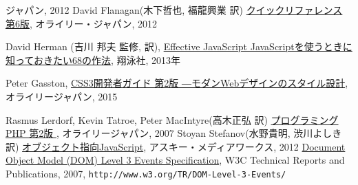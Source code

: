 \begin{thebibliography}{99}
	 ジャパン, 2012
 David Flanagan(木下哲也, 福龍興業 訳) 
            \href{http://www.amazon.co.jp/JavaScriptリファレンス-第6版-David-Flanagan/dp/4873115531/ref=sr_1_11?ie=UTF8&qid=1353802698&sr=8-11}
{\JS{} クイックリファレンス 第6版}, オライリー・ジャパン, 2012
\iffalse
 \bibitem{geroimenko}
Vladimir Geroimenko, Chaomei Chen(Ed.),\\
\href{http://www.amazon.co.jp/exec/obidos/ASIN/1852337907/qid=1146667282/sr=1-1/ref=sr_1_10_1/249-3353534-4529100}
   {\it Visualizing
	Information Using SVG and X3D: XML-based Technologies For The
	XML-based Web}, Springer Verlag 2005
\fi
{}David Herman (吉川 邦夫 監修, 訳),
\href{http://www.amazon.co.jp/Effective-JavaScript-JavaScript%E3%82%92%E4%BD%BF%E3%81%86%E3%81%A8%E3%81%8D%E3%81%AB%E7%9F%A5%E3%81%A3%E3%81%A6%E3%81%8A%E3%81%8D%E3%81%9F%E3%81%8468%E3%81%AE%E5%86%B4%E3%81%88%E3%81%9F%E3%82%84%E3%82%8A%E6%96%B9-David-Herman/dp/4798131113/ref=sr_1_1?ie=UTF8&qid=1365329955&sr=8-1&keywords=JavaScript%E3%82%92%E4%BD%BF%E3%81%86%E3%81%A8%E3%81%8D%E3%81%AB%E7%9F%A5%E3%81%A3%E3%81%A6%E3%81%8A%E3%81%8D%E3%81%9F%E3%81%84%EF%BC%96%EF%BC%98}
{Effective JavaScript JavaScriptを使うときに知っておきたい68の作法}, 
翔泳社, 2013年

 Peter Gasston,
				 \href{https://www.amazon.co.jp/s/ref=nb_sb_ss_i_5_4/351-1343008-2819052?__mk_ja_JP=%E3%82%AB%E3%82%BF%E3%82%AB%E3%83%8A&url=search-alias%3Daps&field-keywords=css3%E9%96%8B%E7%99%BA%E8%80%85%E3%82%AC%E3%82%A4%E3%83%89&sprefix=css3%2Caps%2C226&crid=2KO0TT8P0FOGT}{CSS3開発者ガイド 第2版 ―モダンWebデザインのスタイル設計},
				 オライリージャパン, 2015

\ifSeminor
\else
{}
Rasmus Lerdorf, Kevin Tatroe, Peter MacIntyre(高木正弘 訳)
\href{http://www.amazon.co.jp/プログラミングPHP-第2版-Rasmus-Lerdorf/dp/4873113423/ref=sr_1_6?ie=UTF8&s=gateway&qid=1202533375&sr=8-6}
        {プログラミングPHP 第2版 },  オライリージャパン, 2007
\fi
 Stoyan Stefanov(水野貴明, 渋川よしき 訳)
\href{http://www.amazon.co.jp/オブジェクト指向
	JavaScript-Stoyan-Stefanov/dp/4048706705/ref=sr_1_1?ie=UTF8&qid=1353803180&sr=8-1}
{オブジェクト指向JavaScript}, アスキー・メディアワークス, 2012
\href{http://www.w3.org/TR/2007/DOM-Level-3-Events-20071221/}
{Document Object Model (DOM) Level 3 Events Specification},
    W3C Technical Reports and Publications, 2007,
\texttt{http://www.w3.org/TR/DOM-Level-3-Events/}


\end{thebibliography}

